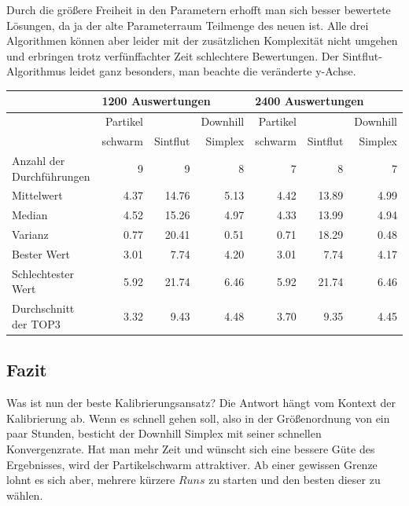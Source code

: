 \documentclass[a4paper,12pt]{article}
\begin{document}
Durch die größere Freiheit in den Parametern erhofft man sich besser bewertete Lösungen, da ja der alte Parameterraum Teilmenge des neuen ist. Alle drei Algorithmen können aber leider mit der zusätzlichen Komplexität nicht umgehen und erbringen trotz verfünffachter Zeit schlechtere Bewertungen. Der Sintflut-Algorithmus leidet ganz besonders, man beachte die veränderte y-Achse.

\begin{center}
\begin{tabular}{| l || r | r | r || r | r | r ||}
\hline
        & \multicolumn{3}{l||}{1200 Auswertungen} & \multicolumn{3}{l||}{2400 Auswertungen} \\ \hline
        & Partikel &          & Downhill & Partikel &          & Downhill\\ 
        & schwarm  & Sintflut & Simplex  & schwarm  & Sintflut & Simplex\\ \hline
Anzahl der Durchführungen  & 9 & 9 & 8 & 7 & 8 & 7 \\ \hline
Mittelwert                 & 4.37 & 14.76 & 5.13 & 4.42 & 13.89 & 4.99 \\ \hline
Median                     & 4.52 & 15.26 & 4.97 & 4.33 & 13.99 & 4.94 \\ \hline
Varianz                    & 0.77 & 20.41 & 0.51 & 0.71 & 18.29 & 0.48 \\ \hline
Bester Wert                & 3.01 &  7.74 & 4.20 & 3.01 &  7.74 & 4.17 \\ \hline
Schlechtester Wert         & 5.92 & 21.74 & 6.46 & 5.92 & 21.74 & 6.46 \\ \hline
Durchschnitt der TOP3      & 3.32 &  9.43 & 4.48 & 3.70 &  9.35 & 4.45 \\ \hline
\end{tabular}
\end{center}

\subsection{Fazit}

Was ist nun der beste Kalibrierungsansatz? Die Antwort hängt vom Kontext der Kalibrierung ab. Wenn es schnell gehen soll, also in der Größenordnung von ein paar Stunden, besticht der Downhill Simplex mit seiner schnellen Konvergenzrate. Hat man mehr Zeit und wünscht sich eine bessere Güte des Ergebnisses, wird der Partikelschwarm attraktiver. Ab einer gewissen Grenze lohnt es sich aber, mehrere kürzere $Runs$ zu starten und den besten dieser zu wählen.
\end{document}
